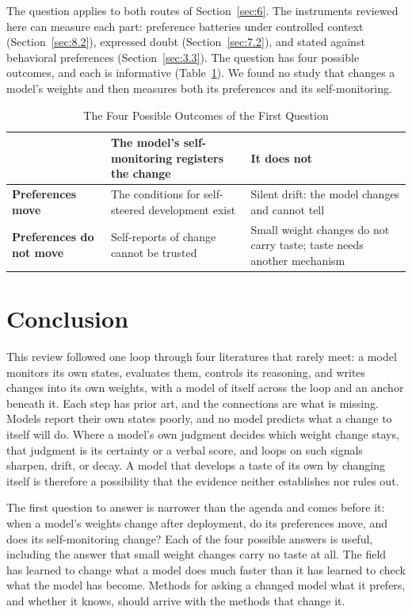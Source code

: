 \documentclass[journal]{IEEEtran}
\begin{document}
The question applies to both routes of Section~\ref{sec:6}. The instruments reviewed here can measure each part: preference batteries under controlled context (Section~\ref{sec:8.2}), expressed doubt (Section~\ref{sec:7.2}), and stated against behavioral preferences (Section~\ref{sec:3.3}). The question has four possible outcomes, and each is informative (Table~\ref{tab:7}). We found no study that changes a model's weights and then measures both its preferences and its self-monitoring.

\begin{table}[!t]
\caption{The Four Possible Outcomes of the First Question}\label{tab:7}
\centering\footnotesize\renewcommand{\arraystretch}{1.15}
\begin{tabularx}{\columnwidth}{@{}>{\raggedright\arraybackslash}p{}>{\raggedright\arraybackslash}X>{\raggedright\arraybackslash}X@{}}
\toprule
 & \textbf{The model's self-monitoring registers the change} & \textbf{It does not} \\
\midrule
\textbf{Preferences move} & The conditions for self-steered development exist & Silent drift: the model changes and cannot tell \\
\textbf{Preferences do not move} & Self-reports of change cannot be trusted & Small weight changes do not carry taste; taste needs another mechanism \\
\bottomrule
\end{tabularx}
\end{table}


\section{Conclusion}\label{sec:10}

This review followed one loop through four literatures that rarely meet: a model monitors its own states, evaluates them, controls its reasoning, and writes changes into its own weights, with a model of itself across the loop and an anchor beneath it. Each step has prior art, and the connections are what is missing. Models report their own states poorly, and no model predicts what a change to itself will do. Where a model's own judgment decides which weight change stays, that judgment is its certainty or a verbal score, and loops on such signals sharpen, drift, or decay. A model that develops a taste of its own by changing itself is therefore a possibility that the evidence neither establishes nor rules out.

The first question to answer is narrower than the agenda and comes before it: when a model's weights change after deployment, do its preferences move, and does its self-monitoring change? Each of the four possible answers is useful, including the answer that small weight changes carry no taste at all. The field has learned to change what a model does much faster than it has learned to check what the model has become. Methods for asking a changed model what it prefers, and whether it knows, should arrive with the methods that change it.
\end{document}
